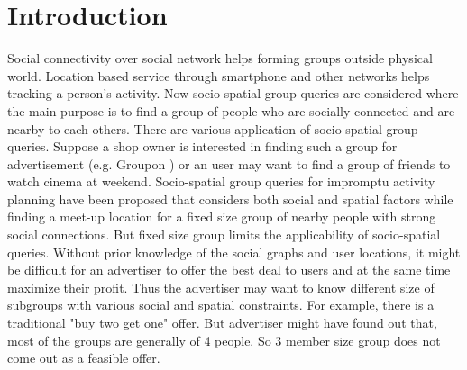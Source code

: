 \documentclass{vldb}
\begin{document}
	\section{Introduction}
		Social connectivity over social network helps forming groups outside physical world. Location based service through smartphone and other networks helps tracking a person's activity. Now socio spatial group queries are considered where the main purpose is to find a group of  people who are socially connected and are nearby to each others. There are various application of socio spatial group queries. Suppose a shop owner is interested in finding such a group for advertisement (e.g. Groupon )  or an user may want to find a group of friends to watch cinema at weekend.  Socio-spatial group queries for impromptu activity planning have been proposed \cite{shen2016socio}  that considers both social and spatial factors while finding a meet-up location for a fixed size group of nearby people with strong social connections. But fixed size group limits the applicability of socio-spatial queries. Without prior knowledge of the social graphs and user locations, it might be difficult for an advertiser to offer the best deal to users and at the same time maximize their profit. Thus the advertiser may want to know different size of subgroups with various social and spatial constraints. For example, there is a traditional "buy two get one" offer. But advertiser might have found out that, most of the groups are generally of 4 people. So 3 member size group does not come out as a feasible offer. 
		
		
		
\end{document}
